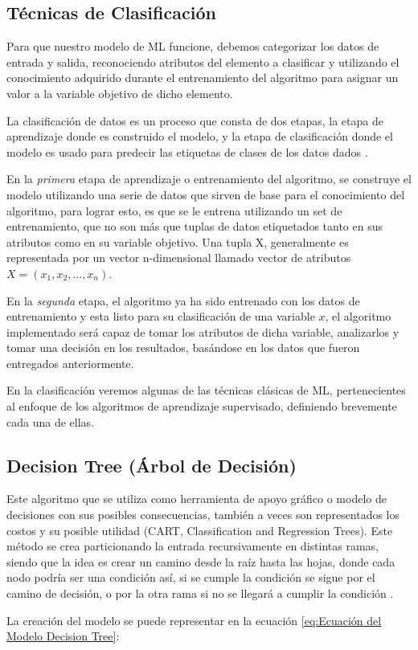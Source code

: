\doublespacing
\subsection{Técnicas de Clasificación}
Para que nuestro modelo de ML funcione, debemos categorizar los datos de entrada y salida, reconociendo atributos del elemento a clasificar y utilizando el conocimiento adquirido durante el entrenamiento del algoritmo para asignar un valor a la variable objetivo de dicho elemento.\\
\par La clasificación de datos es un proceso que consta de dos etapas, la etapa de aprendizaje donde es construido el modelo, y la etapa de clasificación donde el modelo es usado para predecir las etiquetas de clases de los datos dados \cite{han2012data}.\\
\par En la \textit{primera} etapa de aprendizaje o entrenamiento del algoritmo, se construye el modelo utilizando una serie de datos que sirven de base para el conocimiento del algoritmo, para lograr esto, es que se le entrena utilizando un set de entrenamiento, que no son más que tuplas de datos etiquetados tanto en sus atributos como en su variable objetivo. Una tupla X, generalmente es representada por un vector n-dimensional llamado vector de atributos $ X = (x_{1}, x_{2}, ..., x_{n}) $.\\
\par En la \textit{segunda} etapa, el algoritmo ya ha sido entrenado con los datos de entrenamiento y esta listo para su clasificación de una variable $ x $, el algoritmo implementado
será capaz de tomar los atributos de dicha variable, analizarlos y tomar una decisión en los resultados, basándose en los datos que fueron entregados anteriormente.\\
\par En la clasificación veremos algunas de las técnicas clásicas de ML, pertenecientes al enfoque de los algoritmos de aprendizaje supervisado, definiendo brevemente cada una de ellas.\\


\doublespacing
\subsection{Decision Tree (Árbol de Decisión)}
Este algoritmo que se utiliza como herramienta de apoyo gráfico o modelo de decisiones con sus posibles consecuencias, también a veces son representados los costos y su posible utilidad (CART, Classification and Regression Trees). Este método se crea particionando la entrada recursivamente en distintas ramas, siendo que la idea es crear un camino desde la raíz hasta las hojas, donde cada nodo podría ser una condición así, si se cumple la condición se sigue por el camino de decisión, o por la otra rama si no se llegará a cumplir la condición \cite{Harrington2012}.\\
\par La creación del modelo se puede representar en la ecuación \ref{eq:Ecuación del Modelo Decision Tree}:\\

